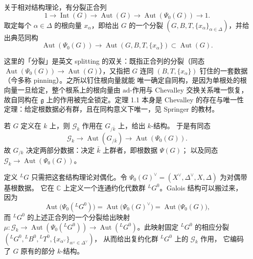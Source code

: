 关于相对结构理论，有分裂正合列
\[
  1\longrightarrow\operatorname{Int}(G)\longrightarrow\operatorname{Aut}(G)
  \longrightarrow\operatorname{Aut}(\Psi_0(G))\longrightarrow 1.
\]
取定每个 $\alpha\in\Delta$ 的根向量 $x_\alpha$，即给出 $G$ 的一个分裂
$(G,B,T,\{x_\alpha\}_{\alpha\in\Delta})$，并给出典范同构
\[
  \operatorname{Aut}(\Psi_0(G))\longrightarrow
  \operatorname{Aut}(G,B,T,\{x_\alpha\})\subset\operatorname{Aut}(G).
\]
\begin{annote}
这里的「分裂」是英文 splitting 的双关：既指正合列的分裂（同态
$\operatorname{Aut}(\Psi_0(G))\to\operatorname{Aut}(G)$），又指把 $G$ 连同
$(B,T,\{x_\alpha\})$ 钉住的一套数据（今多称 pinning）。之所以钉住根向量就能
唯一确定自同构，是因为单根处的根向量一旦给定，整个根系上的根向量由
$\mathrm{ad}$-作用与 Chevalley 交换关系唯一恢复，故自同构在
$\mathfrak{g}$ 上的作用被完全锁定。定理 1.1 本身是 Chevalley 的存在与唯一性
定理：给定根数据必有群，且在同构意义下唯一，见 Springer 的教材。
\par{}
\end{annote}

若 $G$ 定义在 $k$ 上，则 $\mathcal{G}_k$ 作用在 $G_{/\bar k}$ 上，给出 $k$-结构。
于是有同态
\[
  \mathcal{G}_k\longrightarrow\operatorname{Aut}(G_{/\bar k})
  \longrightarrow\operatorname{Aut}(\Psi_0(G)).
\]
故 $G_{/k}$ 决定两部分数据：决定 $\bar k$ 上群者，即根数据 $\Psi(G)$；
以及同态 $\mathcal{G}_k\to\operatorname{Aut}(\Psi_0(G))$。

定义 ${}^{L}G$ 只需把这套结构理论对偶化。令
$\Psi_0(G)^{\vee}=(X^{\vee},\Delta^{\vee},X,\Delta)$ 为对偶带基根数据。
它在 $\mathbb{C}$ 上定义一个连通约化代数群 ${}^{L}G^{0}$。Galois 结构可以搬过来，
因为
\[
  \operatorname{Aut}\bigl(\Psi_0({}^{L}G^{0})\bigr)
  =\operatorname{Aut}\bigl(\Psi_0(G)^{\vee}\bigr)
  =\operatorname{Aut}\bigl(\Psi_0(G)\bigr),
\]
而 ${}^{L}G^{0}$ 的上述正合列的一个分裂给出映射
$\mu\colon\mathcal{G}_k\to\operatorname{Aut}(\Psi_0({}^{L}G^{0}))
\to\operatorname{Aut}({}^{L}G^{0})$。此映射固定 ${}^{L}G^{0}$ 的相应分裂
$({}^{L}G^{0},{}^{L}B^{0},{}^{L}T^{0},\{x_{\alpha^{\vee}}\}_{\alpha^{\vee}\in\Delta^{\vee}})$，
从而给出复约化群 ${}^{L}G^{0}$ 上的 $\mathcal{G}_k$ 作用，
它编码了 $G$ 原有的部分 $k$-结构。

